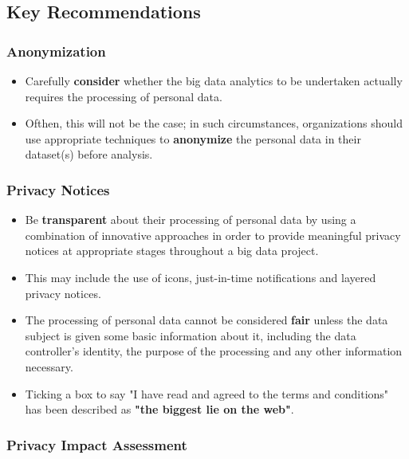 \documentclass[a4paper]{article}
\begin{document}
		\newpage
		
		\subsection{Key Recommendations}
		
			\subsubsection{Anonymization}
			
			\begin{itemize}
				\item Carefully \textbf{consider} whether the big data analytics to be undertaken actually requires the processing of personal data.
				\item Ofthen, this will not be the case; in such circumstances, organizations should use appropriate techniques to \textbf{anonymize} the personal data in their dataset(s) before analysis.
			\end{itemize}
		
			\subsubsection{Privacy Notices}
			
			\begin{itemize}
				\item Be \textbf{transparent} about their processing of personal data by using a combination of innovative approaches in order to provide meaningful privacy notices at appropriate stages throughout a big data project.
				\item This may include the use of icons, just-in-time notifications and layered privacy notices.
				\item The processing of personal data cannot be considered \textbf{fair} unless the data subject is given some basic information about it, including the data controller's identity, the purpose of the processing and any other information necessary.
				\item Ticking a box to say "I have read and agreed to the terms and conditions" has been described as \textbf{"the biggest lie on the web"}.
			\end{itemize}
		
			\subsubsection{Privacy Impact Assessment}
			
\end{document}
